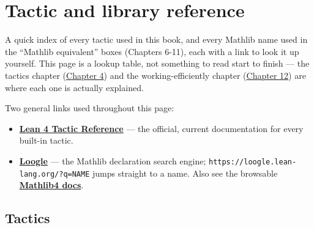 \chapter*{Tactic and library reference}
\setcounter{section}{0}\label{sec:root:tactic-and-library-reference:1}

A quick index of every tactic used in this book, and every Mathlib name used in the ``Mathlib equivalent'' boxes (Chapters 6-11), each with a link to look it up yourself. This page is a lookup table, not something to read start to finish --- the tactics chapter (\hyperref[sec:04-tactics:00-index:1]{Chapter 4}) and the working-efficiently chapter (\hyperref[sec:12-working-efficiently:00-index:1]{Chapter 12}) are where each one is actually explained.

Two general links used throughout this page:

\begin{itemize}
\tightlist
\item
  \textbf{\href{https://lean-lang.org/doc/reference/latest/Tactic-Proofs/Tactic-Reference/}{Lean 4 Tactic Reference}} --- the official, current documentation for every built-in tactic.
\item
  \textbf{\href{https://loogle.lean-lang.org/}{Loogle}} --- the Mathlib declaration search engine; \texttt{https:/\allowbreak{}/\allowbreak{}loogle.lean-\allowbreak{}lang.org/\allowbreak{}?q=NAME} jumps straight to a name. Also see the browsable \textbf{\href{https://leanprover-community.github.io/mathlib4_docs/}{Mathlib4 docs}}.
\end{itemize}

\section*{Tactics}
\label{sec:root:tactic-and-library-reference:2}


